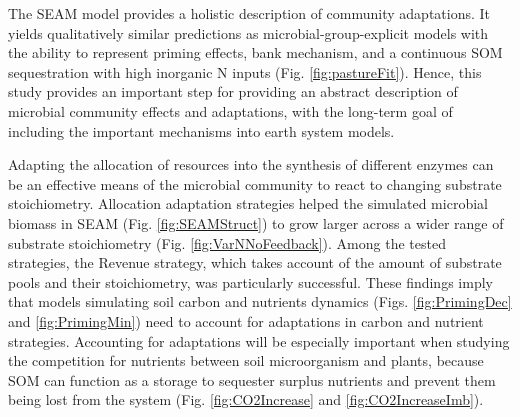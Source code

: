 \conclusions   
 
The SEAM model provides a holistic description of community adaptations. It
yields qualitatively similar predictions as microbial-group-explicit models
with the ability to represent priming effects, bank mechanism, and
a continuous SOM sequestration with high inorganic N inputs (Fig.
\ref{fig:pastureFit}). Hence, this study provides an important step for providing an abstract
description of microbial community effects and adaptations, with the long-term
goal of including the important mechanisms into earth system models.

Adapting the allocation of resources into the synthesis of different
enzymes can be an effective means of the microbial community to react to
changing substrate stoichiometry. Allocation adaptation strategies helped the simulated microbial biomass in SEAM
(Fig. \ref{fig:SEAMStruct}) to grow larger across a wider
range of substrate stoichiometry (Fig. \ref{fig:VarNNoFeedback}). Among the
tested strategies, the Revenue strategy, which takes account of the amount of substrate pools and their stoichiometry, was particularly successful.
These findings imply that models simulating soil carbon and nutrients
dynamics (Figs. \ref{fig:PrimingDec} and \ref{fig:PrimingMin}) need to account for
adaptations in carbon and nutrient strategies. Accounting for adaptations will
be especially important when studying the competition for nutrients between
soil microorganism and plants, because SOM can function as a storage to
sequester surplus nutrients and prevent them being lost from the system (Fig.
\ref{fig:CO2Increase} and \ref{fig:CO2IncreaseImb}).




